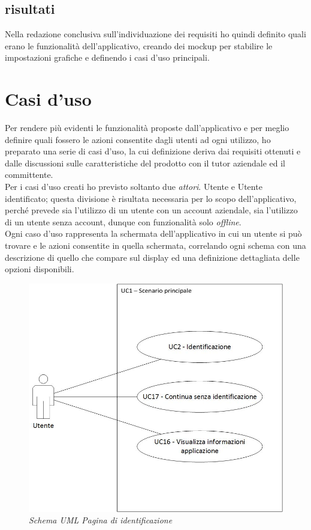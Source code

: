 \subsection{risultati}
Nella redazione conclusiva sull'individuazione dei requisiti ho quindi definito quali erano le funzionalità dell'applicativo, creando dei mockup per stabilire le impostazioni grafiche e definendo i casi d'uso principali.
\section{Casi d'uso}
Per rendere più evidenti le funzionalità proposte dall'applicativo e per meglio definire quali fossero le azioni consentite dagli utenti ad ogni utilizzo, ho preparato una serie di casi d'uso, la cui definizione deriva dai requisiti ottenuti e dalle discussioni sulle caratteristiche del prodotto con il tutor aziendale ed il committente. \\
Per i casi d'uso creati ho previsto soltanto due \textit{attori}. Utente e Utente identificato; questa divisione è risultata necessaria per lo scopo dell'applicativo, perché prevede sia l'utilizzo di un utente con un account aziendale, sia l'utilizzo di un utente senza account, dunque con funzionalità solo \textit{offline}. \\
Ogni caso d'uso rappresenta la schermata dell'applicativo in cui un utente si può trovare e le azioni consentite in quella schermata, correlando ogni schema con una descrizione di quello che compare sul display ed una definizione dettagliata delle opzioni disponibili.
\begin{figure}[ht]
	\centering
	\includegraphics[scale=0.35]{immagini/analisi/UC01_scenario_principale.jpg}
	\caption{\textit{Schema UML Pagina di identificazione}}
\end{figure}\FloatBarrier

